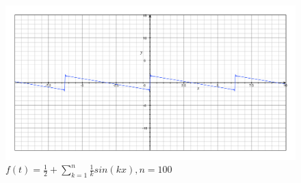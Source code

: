 \begin{figure}[p] %
   \centering
   \includegraphics[width=0.4\textheight]{Uebung2/Aufgabe_2_2_c.pdf} 
   \caption{$f(t)=\frac{1}{2}+\sum_{k=1}^n \frac{1}{k}sin(kx), n=100$}
   \label{fig:2.2.c}
\end{figure}

